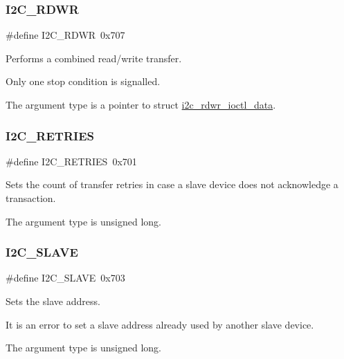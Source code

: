 \subsubsection{\texorpdfstring{I2C\_RDWR}{I2C\_RDWR}}
{\footnotesize\ttfamily \#define I2\+C\+\_\+\+R\+D\+WR~0x707}



Performs a combined read/write transfer. 

Only one stop condition is signalled.

The argument type is a pointer to struct \mbox{\hyperlink{structi2c__rdwr__ioctl__data}{i2c\+\_\+rdwr\+\_\+ioctl\+\_\+data}}. \mbox{\label{group__I2CLinux_gae8b7ab32459314e0c0162974f2ce22e1}} 
\subsubsection{\texorpdfstring{I2C\_RETRIES}{I2C\_RETRIES}}
{\footnotesize\ttfamily \#define I2\+C\+\_\+\+R\+E\+T\+R\+I\+ES~0x701}



Sets the count of transfer retries in case a slave device does not acknowledge a transaction. 

The argument type is unsigned long. \mbox{\label{group__I2CLinux_gab15137f7c592d05573de99f078516157}} 
\subsubsection{\texorpdfstring{I2C\_SLAVE}{I2C\_SLAVE}}
{\footnotesize\ttfamily \#define I2\+C\+\_\+\+S\+L\+A\+VE~0x703}



Sets the slave address. 

It is an error to set a slave address already used by another slave device.

The argument type is unsigned long. \mbox{\label{group__I2CLinux_gafb1764d4b58fb542306c715ad6a28a42}} 
